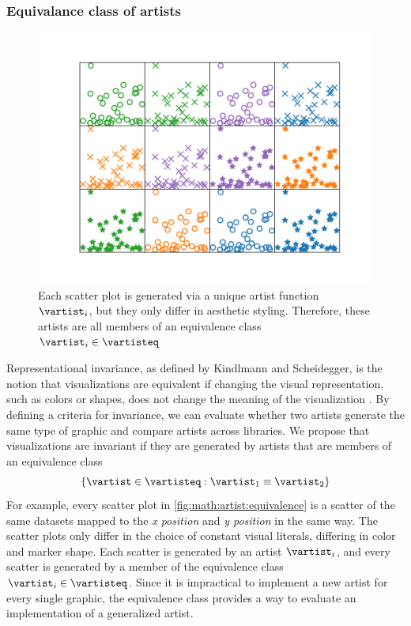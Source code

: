 \documentclass[../main.tex]{subfiles}
\begin{document}
\subsubsection{Equivalance class of artists}
\label{sec:artist_equivalance}
\begin{figure}[H]
    \includegraphics[width=1\textwidth]{figures/math/equivalent_artists.png}
   \caption{Each scatter plot is generated via a unique artist function $\vartist_{i}$, but they only differ in aesthetic styling. Therefore, these artists are all members of an equivalence class $\vartist_{i} \in \vartisteq$}
    \label{fig:math:artist:equivalence}
\end{figure}
Representational invariance, as defined by Kindlmann and Scheidegger, is the notion that visualizations are equivalent if changing the visual representation, such as colors or shapes, does not change the meaning of the visualization \cite{kindlmannAlgebraicProcessVisualization2014}. By defining a criteria for invariance, we can evaluate whether two artists generate the same type of graphic and compare artists across libraries. We propose that visualizations are invariant if they are generated by artists that are members of an equivalence class 
\begin{equation*}
\{\vartist \in \vartisteq: \vartist_{1} \equiv \vartist_{2}\}
\label{eq:math:artist:aprime}
\end{equation*}
For example, every scatter plot in \autoref{fig:math:artist:equivalence} is a scatter of the same datasets mapped to the \textit{x position} and \textit{y position} in the same way. The scatter plots only differ in the choice of constant visual literals, differing in color and marker shape. Each scatter is generated by an artist $\vartist_{i}$, and every scatter is generated by a member of the equivalence class $\vartist_{i} \in \vartisteq$. Since it is impractical to implement a new artist for every single graphic, the equivalence class provides a way to evaluate an implementation of a generalized artist. 
\end{document}
